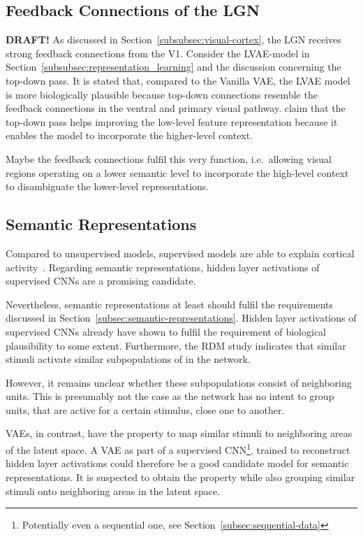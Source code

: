 \subsection{Feedback Connections of the \acl{LGN}}\label{subsec:feedback-connections-of-the-lateral-geniculate-nucleus}
\textbf{DRAFT!}
As discussed in Section~\ref{subsubsec:visual-cortex}, the \ac{LGN} receives strong feedback connections from the \ac{V1}.
Consider the \ac{LVAE}-model in Section~\ref{subsubsec:representation_learning} and the discussion concerning the top-down pass.
It is stated that, compared to the Vanilla VAE, the \ac{LVAE} model is more biologically plausible because top-down connections resemble the feedback connections in the ventral and primary visual pathway.
\citet{sonderby2016ladder} claim that the top-down pass helps improving the low-level feature representation because it enables the model to incorporate the higher-level context.

Maybe the feedback connections fulfil this very function, i.e.\ allowing visual regions operating on a lower semantic level to incorporate the high-level context to disambiguate the lower-level representations.

\subsection{Semantic Representations}\label{subsec:semantic-representations-results}
Compared to unsupervised models, supervised models are able to explain cortical activity~\citep{khaligh2014deep,cadieu2014deep}.
Regarding semantic representations, hidden layer activations of supervised \acp{CNN} are a promising candidate.

Nevertheless, semantic representations at least should fulfil the requirements discussed in Section~\ref{subsec:semantic-representations}.
Hidden layer activations of supervised \acp{CNN} already have shown to fulfil the requirement of biological plausibility to some extent.
Furthermore, the \ac{RDM} study indicates that similar stimuli activate similar subpopulations of  in the network.

However, it remains unclear whether these subpopulations consist of neighboring units.
This is presumably not the case as the network has no intent to group units, that are active for a certain stimulus, close one to another.

\acfp{VAE}, in contrast, have the property to map similar stimuli to neighboring areas of the latent space.
A \ac{VAE} as part of a supervised \ac{CNN}\footnote{Potentially even a sequential one, see Section~\ref{subsec:sequential-data}}, trained to reconstruct hidden layer activations could therefore be a good candidate model for semantic representations.
It is suspected to obtain the  property while also grouping similar stimuli onto neighboring areas in the latent space.

